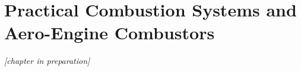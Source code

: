 \chapter{Practical Combustion Systems and Aero-Engine Combustors}\label{ch:combustors}

\emph{[chapter in preparation]}
